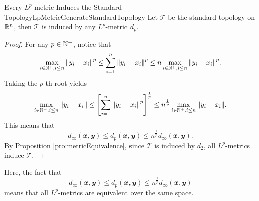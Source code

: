 \documentclass[math]{amznotes}
\theoremstyle{remark}
\begin{document}
\begin{corbox}{Every $L^p$-metric Induces the Standard Topology}{LpMetricGenerateStandardTopology}
    Let $\mathcal{T}$ be the standard topology on $\mathbb{R}^n$, then $\mathcal{T}$ is induced by any $L^p$-metric $d_p$.
    \tcblower
    \begin{proof}
        For any $p \in \mathbb{N}^+$, notice that 
        \begin{equation*}
            \max_{i \in \mathbb{N}^+, i \leq n}{\left\lVert {y_i - x_i} \right\rVert}^p \leq \sum_{i = 1}^{n}{\left\lVert {y_i - x_i} \right\rVert}^p \leq n\max_{i \in \mathbb{N}^+, i \leq n}{\left\lVert {y_i - x_i} \right\rVert}^p.
        \end{equation*}
        Taking the $p$-th root yields
        \begin{equation*}
            \max_{i \in \mathbb{N}^+, i \leq n}{\left\lVert {y_i - x_i} \right\rVert} \leq \left[\sum_{i = 1}^{n}{\left\lVert {y_i - x_i} \right\rVert}^p\right]^{\frac{1}{p}} \leq n^{\frac{1}{p}}\max_{i \in \mathbb{N}^+, i \leq n}{\left\lVert {y_i - x_i} \right\rVert}.
        \end{equation*}
        This means that 
        \begin{equation*}
            d_{\infty}\left(\mathbfit{x}, \mathbfit{y}\right) \leq d_p\left(\mathbfit{x}, \mathbfit{y}\right) \leq n^{\frac{1}{p}}d_{\infty}\left(\mathbfit{x}, \mathbfit{y}\right).
        \end{equation*}
        By Proposition \ref{pro:metricEquivalence}, since $\mathcal{T}$ is induced by $d_2$, all $L^p$-metrics induce $\mathcal{T}$.
    \end{proof}
\end{corbox}
Here, the fact that
\begin{equation*}
    d_{\infty}\left(\mathbfit{x}, \mathbfit{y}\right) \leq d_p\left(\mathbfit{x}, \mathbfit{y}\right) \leq n^{\frac{1}{p}}d_{\infty}\left(\mathbfit{x}, \mathbfit{y}\right)
\end{equation*}
means that all $L^p$-metrics are equivalent over the same space.
\end{document}

